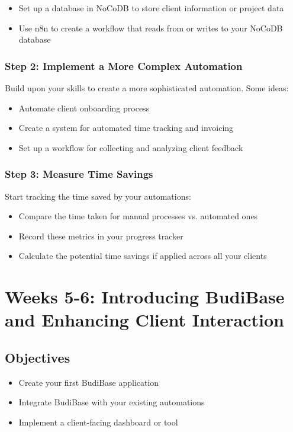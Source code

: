 \begin{itemize}
    \item Set up a database in NoCoDB to store client information or project data
    \item Use n8n to create a workflow that reads from or writes to your NoCoDB database
\end{itemize}


\subsubsection{Step 2: Implement a More Complex Automation}
Build upon your skills to create a more sophisticated automation. Some ideas:

\begin{itemize}
    \item Automate client onboarding process
    \item Create a system for automated time tracking and invoicing
    \item Set up a workflow for collecting and analyzing client feedback
\end{itemize}

\subsubsection{Step 3: Measure Time Savings}
Start tracking the time saved by your automations:

\begin{itemize}
    \item Compare the time taken for manual processes vs. automated ones
    \item Record these metrics in your progress tracker
    \item Calculate the potential time savings if applied across all your clients
\end{itemize}


\section{Weeks 5-6: Introducing BudiBase and Enhancing Client Interaction}

\subsection{Objectives}
\begin{itemize}
    \item Create your first BudiBase application
    \item Integrate BudiBase with your existing automations
    \item Implement a client-facing dashboard or tool
\end{itemize}

